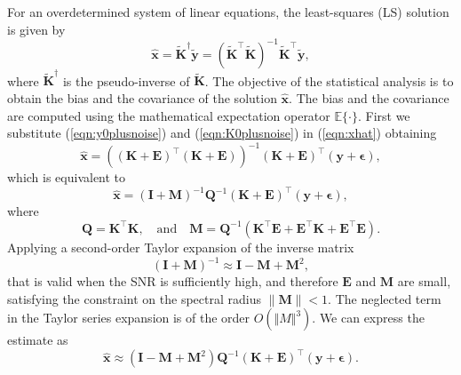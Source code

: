 For an overdetermined system of linear equations, the least-squares (LS) solution is given by
\begin{equation} \widehat{\mathbf{x}} = \widetilde{\mathbf{K}}^\dagger \widetilde{\mathbf{y}} = ( \widetilde{\mathbf{K}}^\top \widetilde{\mathbf{K}} )^{-1} \widetilde{\mathbf{K}}^\top \widetilde{\mathbf{y}} , \label{eqn:xhat} \end{equation}
where $\widetilde{\mathbf{K}}^\dagger$ is the pseudo-inverse of $\widetilde{\mathbf{K}}$.
The objective of the statistical analysis is to obtain the bias and the covariance of the solution $\widehat{\mathbf{x}}$.
The bias and the covariance are computed using the mathematical expectation operator $\mathbb{E}\{\cdot\}$.
First we substitute (\ref{eqn:y0plusnoise}) and (\ref{eqn:K0plusnoise}) in (\ref{eqn:xhat}) obtaining
\begin{equation*} \widehat{\mathbf{x}} = \left( (\mathbf{K}+\mathbf{E})^\top (\mathbf{K}+\mathbf{E})  \right)^{-1} (\mathbf{K}+\mathbf{E})^\top (\mathbf{y}+\bm{\epsilon}), \end{equation*} 
which is equivalent to
\begin{equation} \widehat{\mathbf{x}} = \left( \mathbf{I} + \mathbf{M} \right)^{-1} \mathbf{Q}^{-1} (\mathbf{K}+\mathbf{E})^\top (\mathbf{y}+\bm{\epsilon}), \label{eqn:1steq} \end{equation} 
where 
\begin{equation} \mathbf{Q} = \mathbf{K}^\top \mathbf{K}, \quad \text{and} \quad \mathbf{M} = \mathbf{Q}^{-1} ( \mathbf{K}^\top \mathbf{E} + \mathbf{E}^\top \mathbf{K} + \mathbf{E}^\top \mathbf{E} ). \end{equation} 
Applying a second-order Taylor expansion of the inverse matrix
\begin{equation} (\mathbf{I} + \mathbf{M})^{-1} \approx \mathbf{I} - \mathbf{M} + \mathbf{M}^2, \label{eqn:TseriesExp} \end{equation} 
that is valid when the SNR is sufficiently high, and therefore $\mathbf{E}$ and $\mathbf{M}$ are small, satisfying the constraint on the spectral radius $\| \mathbf{M} \| < 1$. 
The neglected term in the Taylor series expansion is of the order $O(\Vert M \Vert^3)$.
We can express the estimate as
\begin{equation} \widehat{\mathbf{x}} \approx \left( \mathbf{I} - \mathbf{M} + \mathbf{M}^2 \right) \mathbf{Q}^{-1} (\mathbf{K}+\mathbf{E})^\top (\mathbf{y}+\bm{\epsilon}). \label{eqn:xhatexp} \end{equation} 

